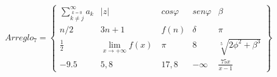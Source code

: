 \documentclass[letterpaper,12pt]{article}
\begin{document}
\[
Arreglo_7 = \left\{\begin{array}{ccccc}
	\displaystyle  \sum_{\overset{k=0}{k\neq j}}^{\infty} a_k & |z| & cos \varphi & sen \varphi & \beta \\
	n/2 & 3n+1 & f(n) & \delta & \pi \\
	\frac{1}{2} & \lim_{x \to +\infty} f(x) \ & \pi & 8 & \sqrt[5]{2 \phi^2 + \beta^3} \\	
	-9.5 & 5,8 & 17,8 & -\infty & \frac{75 x}{x-1}
\end{array}
\right\}
\]
\end{document}

